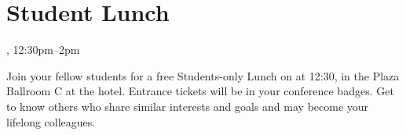 \clearpage
\section{Student Lunch}
\setheaders{}{\daydateyear}

\begin{center}



\daydateyear, 12:30pm--2pm \vspace{1em}\\
\end{center}

Join your fellow students for a free Students-only Lunch on \daydate
at 12:30, in the Plaza Ballroom C at the hotel.  Entrance tickets will
be in your conference badges.  Get to know others who share similar
interests and goals and may become your lifelong colleagues.
